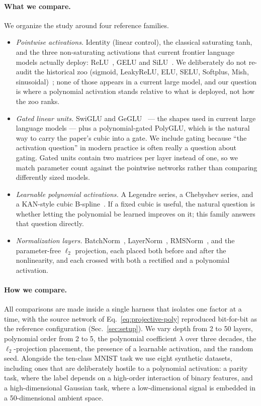 \paragraph{What we compare.}
We organize the study around four reference families.
\begin{itemize}
\item \emph{Pointwise activations.} Identity (linear control), the classical
  saturating tanh, and the three non-saturating activations that current
  frontier language models actually deploy: ReLU~\citep{glorot2011deep}, GELU
  \citep{hendrycks2016gaussian} and SiLU~\citep{elfwing2018sigmoid}.
  We
  deliberately do not re-audit the historical zoo (sigmoid, LeakyReLU, ELU,
  SELU, Softplus, Mish, sinusoidal)~\citep{maas2013rectifier,clevert2015fast,klambauer2017self,misra2019mish,sitzmann2020implicit};
  none of those appears in a current
  large model, and our question is where a polynomial activation stands
  relative to what is deployed, not how the zoo ranks.
\item \emph{Gated linear units.} SwiGLU and GeGLU~\citep{shazeer2020glu,dauphin2017language} --- the shapes used in
  current large language models --- plus a polynomial-gated PolyGLU, which is
  the natural way to carry the paper's cubic into a gate. We include gating
  because ``the activation question'' in modern practice is often really a
  question about gating. Gated units contain two matrices per layer instead
  of one, so we match parameter count against the pointwise networks rather
  than comparing differently sized models.
\item \emph{Learnable polynomial activations.} A Legendre series, a Chebyshev
  series, and a KAN-style cubic B-spline~\citep{liu2024kan}. If a fixed cubic is useful, the
  natural question is whether letting the polynomial be learned improves on
  it; this family answers that question directly.
\item \emph{Normalization layers.} BatchNorm~\citep{ioffe2015batch},
  LayerNorm~\citep{ba2016layer}, RMSNorm~\citep{zhang2019root}, and the
  parameter-free $\ell_2$ projection, each placed both before and after the
  nonlinearity, and each crossed with both a rectified and a polynomial
  activation.
\end{itemize}

\paragraph{How we compare.}
All comparisons are made inside a single harness that isolates one factor at a
time, with the source network of Eq.~\eqref{eq:projective-poly} reproduced
bit-for-bit as the reference configuration (Sec.~\ref{sec:setup}). We vary
depth from 2 to 50 layers, polynomial order from 2 to 5, the polynomial
coefficient $\lambda$ over three decades, the $\ell_2$-projection placement,
the presence of a learnable activation, and the random seed. Alongside the
ten-class MNIST task we use eight synthetic datasets, including ones that are
deliberately hostile to a polynomial activation: a parity task, where the
label depends on a high-order interaction of binary features, and a
high-dimensional Gaussian task, where a low-dimensional signal is embedded in
a 50-dimensional ambient space.

